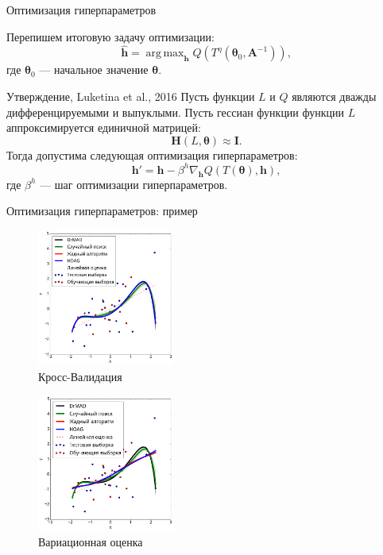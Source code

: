 \documentclass[usenames,dvipsnames,11pt,pdf,utf8,russian,aspectratio=169]{beamer}
\DeclareMathOperator*{\argmax}{arg\,max}
\begin{document}
\begin{frame}{Оптимизация гиперпараметров}

Перепишем итоговую задачу оптимизации:
\[
	\hat{\mathbf{h}} = \argmax_{\mathbf{h}} Q( T^\eta(\boldsymbol{\theta}_0, \mathbf{A}^{-1})),
\]
где $\boldsymbol{\theta}_0$ --- начальное значение $\boldsymbol{\theta}$.

\begin{block}{Утверждение, Luketina et al., 2016}
Пусть функции $L$ и $Q$ являются дважды дифференцируемыми и выпуклыми. 
Пусть гессиан функции функции $L$ аппроксимируется единичной матрицей:
\[
    \mathbf{H}(L, \boldsymbol{\theta}) \approx \mathbf{I}.
\]
Тогда допустима следующая оптимизация гиперпараметров:
\[
    \mathbf{h}' = \mathbf{h} - \beta^{h} \nabla_{\mathbf{h}} Q(T(\boldsymbol{\theta}), \mathbf{h}),
\]
где $\beta^{h}$ --- шаг оптимизации гиперпараметров.
\end{block}
\end{frame}


\begin{frame}{Оптимизация гиперпараметров: пример}
\begin{multicols}{2}
\begin{figure}[h]
\includegraphics[width=0.4\textwidth]{./slide_plots/poly_cv.png}
\caption*{Кросс-Валидация}
\end{figure}

\begin{figure}[h]
\includegraphics[width=0.4\textwidth]{./slide_plots/poly_var.png}
\caption*{Вариационная оценка}
\end{figure}
\end{multicols}

\end{frame}
\end{document}
